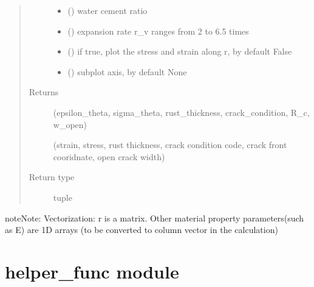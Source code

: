 \documentclass[letterpaper,10pt,english]{sphinxmanual}
\begin{document}
\begin{fulllineitems}
\begin{quote}
\begin{description}
\begin{itemize}
\item {} 
\sphinxAtStartPar
{} (\sphinxstyleliteralemphasis{\sphinxupquote{, }}) \textendash{} water cement ratio

\item {} 
\sphinxAtStartPar
{} () \textendash{} expansion rate r\_v ranges from 2 to 6.5 times

\item {} 
\sphinxAtStartPar
{} (\sphinxstyleliteralemphasis{\sphinxupquote{, }}) \textendash{} if true, plot the stress and strain along r, by default False

\item {} 
\sphinxAtStartPar
{} () \textendash{} subplot axis, by default None

\end{itemize}

\item[{Returns}] \leavevmode
\sphinxAtStartPar

\sphinxAtStartPar
(epsilon\_theta, sigma\_theta, rust\_thickness,
crack\_condition, R\_c, w\_open)

\sphinxAtStartPar
(strain, stress, rust thickness,
crack condition code, crack front cooridnate, open crack width)


\item[{Return type}] \leavevmode
\sphinxAtStartPar
tuple

\end{description}\end{quote}

\begin{sphinxadmonition}{note}{Note:}
\sphinxAtStartPar
Vectorization:
r is a matrix. Other material property parameters(such as E) are 1\sphinxhyphen{}D arrays (to be converted to column vector in the calculation)
\end{sphinxadmonition}

\end{fulllineitems}



\section{helper\_func module}
\label{\detokenize{helper_func:module-helper_func}}\label{\detokenize{helper_func:helper-func-module}}\label{\detokenize{helper_func::doc}}
\sphinxAtStartPar
{}
\end{document}
